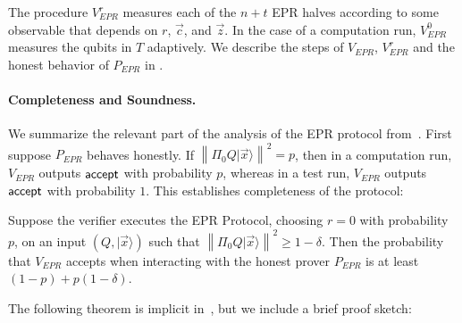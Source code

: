 \documentclass{toc}
\newcommand{\ket}[1]{|#1\rangle}
\newcommand{\norm}[1]{\left\|#1\right\|}
\begin{document}
The procedure $V_{EPR}^r$ measures each of the $n+t$ EPR halves according to
some observable that depends on $r$, $\vec{c}$, and $\vec{z}$. In the case of a
computation run, $V_{EPR}^0$ measures the qubits in $T$ adaptively.  We
describe the steps of $V_{EPR}$, $V_{EPR}^r$ and the honest behavior of
$P_{EPR}$ in .

\paragraph{Completeness and Soundness.} 
We summarize the relevant part of the analysis of the EPR protocol from~\cite{broadbent15howtoverify}. First suppose $P_{EPR}$ behaves honestly. If $\norm{\Pi_0 Q\ket{\vec{x}}}^2=p$, then in a computation run, $V_{EPR}$ outputs $\sf accept$ with probability $p$, whereas in a test run, $V_{EPR}$ outputs $\sf accept$ with probability $1$. This establishes completeness of the protocol:

\begin{theorem}[Completeness]\label{thm:EPR-correctness} 
Suppose the verifier executes the EPR Protocol, choosing $r=0$ with probability $p$, on an input $(Q,\ket{\vec{x}})$ such that $\norm{\Pi_0 Q\ket{\vec{x}}}^2\geq 1-\delta$. Then the probability that $V_{EPR}$ accepts when interacting with the honest prover $P_{EPR}$ is at least $(1-p)+p(1-\delta)$. 
\end{theorem}

The following theorem is implicit in~\cite[Section 7.6]{broadbent15howtoverify}, but we include a brief proof sketch:
\end{document}

